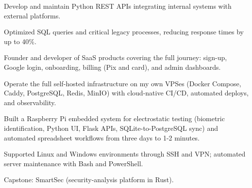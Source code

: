 
\begin{cvbullets}
  \item Develop and maintain Python REST APIs integrating internal systems with external platforms.
  \item Optimized SQL queries and critical legacy processes, reducing response times by up to 40\%.
\end{cvbullets}

\begin{cvbullets}
  \item Founder and developer of SaaS products covering the full journey: sign-up, Google login, onboarding, billing (Pix and card), and admin dashboards.
  \item Operate the full self-hosted infrastructure on my own VPSes (Docker Compose, Caddy, PostgreSQL, Redis, MinIO) with cloud-native CI/CD, automated deploys, and observability.
\end{cvbullets}

\begin{cvbullets}
  \item Built a Raspberry Pi embedded system for electrostatic testing (biometric identification, Python UI, Flask APIs, SQLite-to-PostgreSQL sync) and automated spreadsheet workflows from three days to 1-2 minutes.
\end{cvbullets}

\begin{cvbullets}
  \item Supported Linux and Windows environments through SSH and VPN; automated server maintenance with Bash and PowerShell.
\end{cvbullets}

Capstone: SmartSec (security-analysis platform in Rust).



